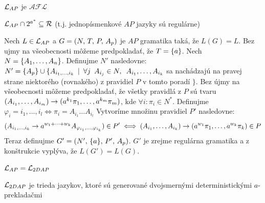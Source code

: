 \begin{veta}
  $\mathcal{L}_{AP}$ je $\mathcal{AFL}$
\end{veta}

\begin{veta}
  $\mathcal{L}_{AP} \cap 2^{a^{*}} \subseteq \mathcal{R}$
  (t.j. jednopísmenkové $AP$ jazyky sú regulárne)
\end{veta}

\begin{dokaz}
  Nech $L \in \mathcal{L}_{AP}$ a $G = (N,\,T,\,P,\,A_p)$ je $AP$ gramatika
  taká, že $L(G) = L$. Bez ujmy na všeobecnosti môžeme predpokladať,
  že $T = \{a\}$. Nech $N = \{A_1,\dots,A_n\}$.
  Definujme $N'$ nasledovne: 
  $N' = \{A_p\} \cup
  \{A_{i_1,\dots,i_k} \enspace |\enspace \forall j \enspace A_{i_j}\in N,\enspace A_{i_1},\dots,A_{i_k}$
  sa nachádzajú na pravej strane niektorého (rovnakého) z pravidiel $P$ v tomto poradí $\}$.
  Bez újmy na všeobecnosti môžeme predpokladať, že všetky
  pravidlá z $P$ sú tvaru
  $(A_{i_1}, \dots, A_{i_m}) \rightarrow (a^{k_1} \pi_1, \dots, a^{k_m} \pi_m)$,
  kde $\forall i: \pi_i \in N^*$. Definujme
  $\varphi_i=i_1,\dots,i_l\Longleftrightarrow\pi_i=A_{i_1}\dots
  A_{i_l}$ Vytvoríme množinu pravidiel $P'$ nasledovne:
  \begin{equation*}
    (A_{i_1, \dots, i_k} \rightarrow
      a^{w_1+\cdots+w_k} A_{\varphi_{i_1},\dots,\varphi_{i_k}}
    ) \in P' \iff
    (A_{i_1}, \dots, A_{i_k}) \rightarrow 
     (a^{w_1}\pi_1, \dots, a^{w_k}\pi_k) \in P
  \end{equation*}
  Teraz definujme $G' = (N',\,\{a\},\,P',\,A_p)$.
  $G'$ je zrejme regulárna gramatika a z konštrukcie vyplýva, že
  $L(G') = L(G)$.
\end{dokaz}

\begin{veta}
  $\mathcal{L}_{AP} = \mathcal{L}_{2DAP}$
\end{veta}

\begin{poznamka}
  $\mathcal{L}_{2DAP}$ je trieda jazykov, ktoré sú generované
  dvojsmernými determi\-nis\-tic\-ký\-mi $a$-prek\-la\-dač\-mi
\end{poznamka}
